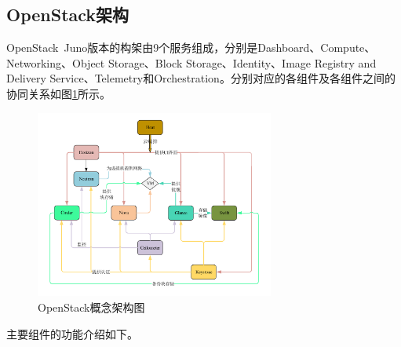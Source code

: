 \subsection{OpenStack架构}
OpenStack\ Juno版本的构架由9个服务组成，分别是Dashboard、Compute、Networking、Object Storage、Block Storage、Identity、Image Registry and Delivery Service、Telemetry和Orchestration。分别对应的各组件及各组件之间的协同关系如图\ref{fig:openstack}所示。

\begin{figure}[!htb]
  \centering
  \includegraphics[width=0.7\textwidth]{logo/openstack}
  \caption{OpenStack概念架构图}
  \label{fig:openstack}
\end{figure}

主要组件的功能介绍如下\cite{OpenStack-3}。

